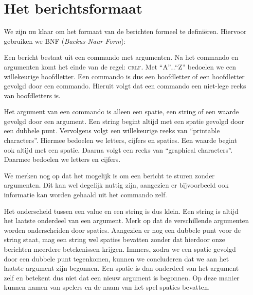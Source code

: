     \section{Het berichtsformaat}
    \label{app:berichtsformaat}
    We zijn nu klaar om het formaat van de berichten formeel te defini\"eren. Hiervoor gebruiken we BNF (\emph{Backus-Naur Form}):
	
	\begin{center} \end{center}

    Een bericht bestaat uit een commando met argumenten. Na het commando en argumenten komt het einde van de regel: \textsc{crlf}. Met ``A''...``Z'' bedoelen we een willekeurige hoofdletter. Een commando is dus een hoofdletter of een hoofdletter gevolgd door een commando. Hieruit volgt dat een commando een niet-lege reeks van hoofdletters is.

    Het argument van een commando is alleen een spatie, een string of een waarde gevolgd door een argument. Een string begint altijd met een spatie gevolgd door een dubbele punt. Vervolgens volgt een willekeurige reeks van ``printable characters''. Hiermee bedoelen we letters, cijfers en spaties. Een waarde begint ook altijd met een spatie. Daarna volgt een reeks van ``graphical characters''. Daarmee bedoelen we letters en cijfers.

    We merken nog op dat het mogelijk is om een bericht te sturen zonder argumenten. Dit kan wel degelijk nuttig zijn, aangezien er bijvoorbeeld ook informatie kan worden gehaald uit het commando zelf.

    Het onderscheid tussen een value en een string is dus klein. Een string is altijd het laatste onderdeel van een argument. Merk op dat de verschillende argumenten worden onderscheiden door spaties. Aangezien er nog een dubbele punt voor de string staat, mag een string wel spaties bevatten zonder dat hierdoor onze berichten meerdere betekenissen krijgen. Immers, zodra we een spatie gevolgd door een dubbele punt tegenkomen, kunnen we concluderen dat we aan het laatste argument zijn begonnen. Een spatie is dan onderdeel van het argument zelf en betekent dus niet dat een nieuw argument is begonnen. Op deze manier kunnen namen van spelers en de naam van het spel spaties bevatten. 